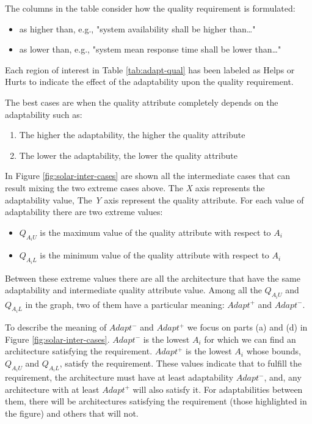 \noindent The columns in the table consider how the quality requirement is formulated:
\begin{itemize}
	\item as higher than, e.g., "system availability shall be higher than\dots"
	\item as lower than, e.g., "system mean response time shall be lower than\dots"
\end{itemize}

Each region of interest in Table \ref{tab:adapt-qual} has been labeled as Helps or Hurts to indicate the effect of the adaptability upon the quality requirement. 

\noindent The best cases are when the quality attribute completely depends on the adaptability such as:
\begin{enumerate}
	\item The higher the adaptability, the higher the quality attribute
	\item The lower the adaptability, the lower the quality attribute
\end{enumerate}

In Figure \ref{fig:solar-inter-cases} are shown all the intermediate cases that can result mixing the two extreme cases above. The \emph{X} axis represents the adaptability value, The \emph{Y} axis represent the quality attribute. For each value of adaptability there are two extreme values:
\begin{itemize}
	\item $Q_{A_iU}$ is the maximum value of the quality attribute with respect to $A_i$
	\item $Q_{A_iL}$ is the minimum value of the quality attribute with respect to $A_i$
\end{itemize} 
Between these extreme values there are all the architecture that have the same adaptability and intermediate quality attribute value. Among all the $Q_{A_iU}$ and $Q_{A_iL}$ in the graph, two of them have a particular meaning: $Adapt^+$ and $Adapt^-$.

To describe the meaning of $Adapt^-$ and $Adapt^+$ we focus on parts (a) and (d) in Figure \ref{fig:solar-inter-cases}. $Adapt^-$ is the lowest $A_i$ for which we can find an architecture satisfying the requirement. $Adapt^+$ is the lowest $A_i$ whose bounds, $Q_{A_iU}$ and $Q_{A_iL}$, satisfy the requirement. These values indicate that to fulfill the requirement, the architecture must have at least adaptability $Adapt^-$, and, any architecture with at least $Adapt^+$ will also satisfy it. For adaptabilities between them, there will be architectures satisfying the requirement (those highlighted in the figure) and others that will not. 

